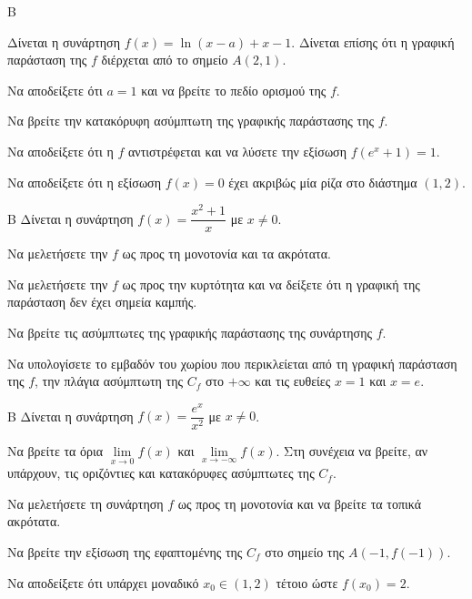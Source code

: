\begin{thema}{Β}

Δίνεται η συνάρτηση $f(x) = \ln(x - a) + x - 1$. Δίνεται επίσης ότι η γραφική παράσταση της $f$ διέρχεται από το σημείο $A(2, 1)$.
\begin{erwthma}
\item Να αποδείξετε ότι $a = 1$ και να βρείτε το πεδίο ορισμού της $f$.
\item Να βρείτε την κατακόρυφη ασύμπτωτη της γραφικής παράστασης της $f$.
\item Να αποδείξετε ότι η $f$ αντιστρέφεται και να λύσετε την εξίσωση $f(e^x + 1) = 1$.
\item Να αποδείξετε ότι η εξίσωση $f(x) = 0$ έχει ακριβώς μία ρίζα στο διάστημα $(1, 2)$.
\end{erwthma}
\end{thema}
\begin{thema}{Β}
Δίνεται η συνάρτηση $f(x) = \dfrac{x^2+1}{x}$ με $x \ne 0$.
\begin{erwthma}
\item Να μελετήσετε την $f$ ως προς τη μονοτονία και τα ακρότατα.
\item Να μελετήσετε την $f$ ως προς την κυρτότητα και να δείξετε ότι η γραφική της παράσταση δεν έχει σημεία καμπής.
\item Να βρείτε τις ασύμπτωτες της γραφικής παράστασης της συνάρτησης $f$.
\item Να υπολογίσετε το εμβαδόν του χωρίου που περικλείεται από τη γραφική παράσταση της $f$, την πλάγια ασύμπτωτη της $C_f$ στο $+\infty$ και τις ευθείες $x=1$ και $x=e$.
\end{erwthma}
\end{thema}

\begin{thema}{Β}
Δίνεται η συνάρτηση $f(x) = \dfrac{e^x}{x^2}$ με $x \ne 0$.
\begin{erwthma}
\item Να βρείτε τα όρια $\lim\limits_{x \to 0} f(x)$ και $\lim\limits_{x \to -\infty} f(x)$. Στη συνέχεια να βρείτε, αν υπάρχουν, τις οριζόντιες και κατακόρυφες ασύμπτωτες της $C_f$.
\item Να μελετήσετε τη συνάρτηση $f$ ως προς τη μονοτονία και να βρείτε τα τοπικά ακρότατα.
\item Να βρείτε την εξίσωση της εφαπτομένης της $C_f$ στο σημείο της $A(-1, f(-1))$.
\item Να αποδείξετε ότι υπάρχει μοναδικό $x_0 \in (1, 2)$ τέτοιο ώστε $f(x_0)=2$.
\end{erwthma}
\end{thema}

